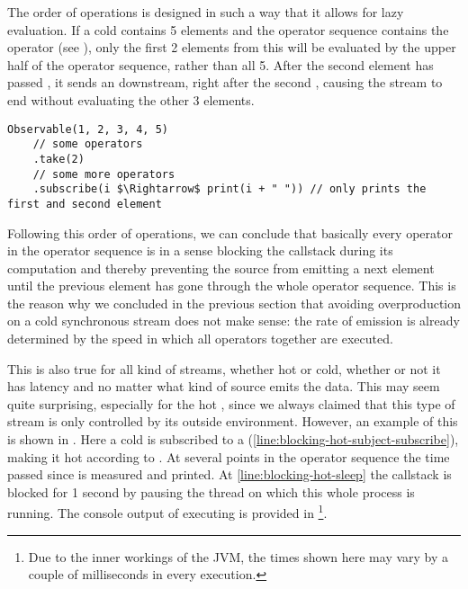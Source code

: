 The order of operations is designed in such a way that it allows for lazy evaluation. If a cold \obs contains 5 elements and the operator sequence contains the operator  (see ), only the first 2 elements from this \obs will be evaluated by the upper half of the operator sequence, rather than all 5. After the second element has passed , it sends an  downstream, right after the second , causing the stream to end without evaluating the other 3 elements.

\hspace*{-\parindent}
\begin{minipage}{\linewidth}
\begin{lstlisting}[style=ScalaStyle, caption={Lazy evaluation}, label={lst:lazy}]
Observable(1, 2, 3, 4, 5)
    // some operators
    .take(2)
    // some more operators
    .subscribe(i $\Rightarrow$ print(i + " ")) // only prints the first and second element
\end{lstlisting}
\end{minipage}

Following this order of operations, we can conclude that basically every operator in the operator sequence is in a sense blocking the callstack during its computation and thereby preventing the source from emitting a next element until the previous element has gone through the whole operator sequence. This is the reason why we concluded in the previous section that avoiding overproduction on a cold synchronous stream does not make sense: the rate of emission is already determined by the speed in which all operators together are executed.

This is also true for all kind of streams, whether hot or cold, whether or not it has latency and no matter what kind of source emits the data. This may seem quite surprising, especially for the hot \obs, since we always claimed that this type of stream is only controlled by its outside environment. However, an example of this is shown in . Here a cold \obs is subscribed to a \subj (\cref{line:blocking-hot-subject-subscribe}), making it hot according to . At several points in the operator sequence the time passed since  is measured and printed. At \cref{line:blocking-hot-sleep} the callstack is blocked for 1 second by pausing the thread on which this whole process is running. The console output of executing  is provided in \footnote{Due to the inner workings of the JVM, the times shown here may vary by a couple of milliseconds in every execution.}.


